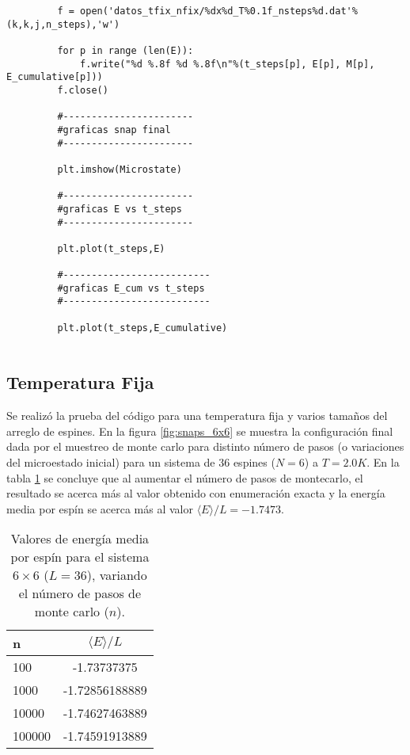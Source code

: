 \documentclass[a4paper,12pt]{article}
\begin{document}
\begin{verbatim}
         f = open('datos_tfix_nfix/%dx%d_T%0.1f_nsteps%d.dat'%(k,k,j,n_steps),'w')
        
         for p in range (len(E)):
             f.write("%d %.8f %d %.8f\n"%(t_steps[p], E[p], M[p], E_cumulative[p]))
         f.close()
        
         #-----------------------
         #graficas snap final
         #-----------------------

         plt.imshow(Microstate)
      
         #-----------------------
         #graficas E vs t_steps
         #-----------------------
         
         plt.plot(t_steps,E)
        
         #--------------------------
         #graficas E_cum vs t_steps
         #--------------------------

         plt.plot(t_steps,E_cumulative)
        
       \end{verbatim}

   \subsection{Temperatura Fija}

   \noindent Se realizó la prueba del código para una temperatura fija y varios tamaños del arreglo de espines. En la figura \ref{fig:snaps_6x6} se muestra la configuración final dada por el muestreo de monte carlo para distinto número de pasos (o variaciones del microestado inicial) para un sistema de 36 espines ($N = 6$) a $T = 2.0 K$.
   \noindent En la tabla \ref{tab:e_per_spin} se concluye que al aumentar el número de pasos de montecarlo, el resultado se acerca más al valor obtenido con enumeración exacta y la energía media por espín se acerca más al valor $\langle E \rangle /L = -1.7473$.

   \begin{table}[H]
     \begin{center}
       \begin{tabular}{| l | c |}
         \hline
         n      & $\langle E \rangle/L$  \\ \hline
         100    & -1.73737375    \\ \hline
         1000   & -1.72856188889 \\
         10000  & -1.74627463889 \\ \hline
         100000 & -1.74591913889 \\
         \hline
       \end{tabular}
       \caption{Valores de energía media por espín para el sistema $6 \times 6$ ($L = 36$), variando el número de pasos de monte carlo ($n$).}
       \label{tab:e_per_spin}
     \end{center}
\end{table}
\end{document}
